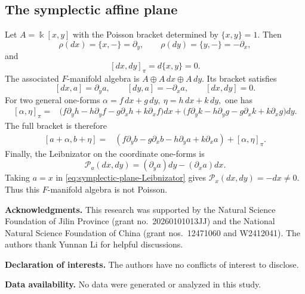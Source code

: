\documentclass[12pt,reqno]{amsart}
\theoremstyle{definition}
\theoremstyle{remark}
\newcommand{\kk}{\Bbbk}
\newcommand{\Pcal}{\mathcal P}
\begin{document}
	
	
	
	\subsection{The symplectic affine plane}
	
	Let
	$
	A=\kk[x,y]$ with the Poisson bracket determined by $\{x,y\}=1.$
	Then
	\[
	\rho(dx)=\{x,-\}=\partial_y,
	\qquad
	\rho(dy)=\{y,-\}=-\partial_x,
	\]
	and
	\[
	[dx,dy]_{\pi}=d\{x,y\}=0.
	\]
	The associated $F$-manifold  algebra is
$
	A\oplus A\,dx\oplus A\,dy.
$
	Its bracket satisfies
	\[
	[dx,a]=\partial_y a,
	\qquad
	[dy,a]=-\partial_x a,
	\qquad
	[dx,dy]=0.
	\]
	For two general one-forms
	$
	\alpha=f\,dx+g\,dy,
	~
	\eta=h\,dx+k\,dy,
$
	one has
	\[
	\begin{aligned}
		[\alpha,\eta]_{\pi}
		={}&\bigl(f\partial_yh-h\partial_yf-g\partial_xh+k\partial_xf\bigr)dx +\bigl(f\partial_yk-h\partial_yg-g\partial_xk+k\partial_xg\bigr)dy.
	\end{aligned}
	\]
	The full bracket is therefore
	\[
	\begin{aligned}
		[a+\alpha,b+\eta]
		={}&(f \partial_yb-g \partial_xb-h \partial_ya+k\partial_x a) + [\alpha,\eta]_{\pi}.
	\end{aligned}
	\]
	Finally, the Leibnizator on the coordinate one-forms is
	\begin{equation}\label{eq:symplectic-plane-Leibnizator}
		\Pcal_a(dx,dy)=(\partial_y a)dy-(\partial_x a)dx.
	\end{equation}
	Taking $a=x$ in \eqref{eq:symplectic-plane-Leibnizator} gives
	$\Pcal_x(dx,dy)=-dx\neq0$.  Thus this $F$-manifold algebra is not Poisson.
	
	\vspace{3mm}
	
	\noindent
	\textbf{Acknowledgments.} This research was supported by the Natural Science
	Foundation of Jilin Province (grant no.~20260101013JJ) and the National Natural
	Science Foundation of China (grant nos.~12471060 and W2412041).  The authors
	thank Yunnan Li for helpful discussions.
	
	\smallskip
	\noindent
	\textbf{Declaration of interests.} The authors have no conflicts of interest
	to disclose.
	
	\smallskip
	\noindent
	\textbf{Data availability.} No data were generated or analyzed in this study.
	
\end{document}
